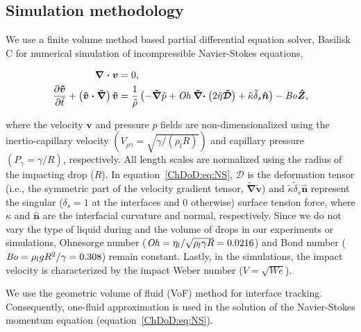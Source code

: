 \begin{subappendices}
	\section{Simulation methodology}
	\label{ChDoD:sec:simulationMethodology}
	
	We use a finite volume method based partial differential equation solver, Basilisk C \citep{basiliskpopinet1} for numerical simulation of incompressible Navier-Stokes equations,
	
	\begin{align}
		\label{ChDoD:eq:continuity}
		\boldsymbol{\nabla\cdot v} &= 0,\\
		\label{ChDoD:eq:NS}
		\frac{\partial \boldsymbol{\tilde{v}}}{\partial\tilde{t}} + \left(\boldsymbol{\tilde{v}\cdot\tilde{\nabla}}\right)\boldsymbol{\tilde{v}} &= \frac{1}{\tilde{\rho}}\left(-\boldsymbol{\tilde{\nabla}}\tilde{p} + \mathit{Oh}\boldsymbol{\tilde{\nabla}\cdot}\left(2\tilde{\eta}\boldsymbol{\tilde{\mathcal{D}}}\right) + \tilde{\kappa}\tilde{\delta}_s\boldsymbol{\hat{n}}\right) - \mathit{Bo}\boldsymbol{\hat{Z}},
	\end{align}
	
	\noindent where the velocity $\boldsymbol{v}$ and pressure $p$ fields are non-dimensionalized using the inertio-capillary velocity $\left(V_{\rho\gamma} = \sqrt{\gamma/\left(\rho_lR\right)}\right)$ and capillary pressure $\left(P_{\gamma} = \gamma/R\right)$, respectively. All length scales are normalized using the radius of the impacting drop ($R$). In equation~\eqref{ChDoD:eq:NS}, $\boldsymbol{\mathcal{D}}$ is the deformation tensor (i.e., the symmetric part of the velocity gradient tensor, $\boldsymbol{\tilde{\nabla}\tilde{v}}$) and $\tilde{\kappa}\tilde{\delta}_s\boldsymbol{\hat{n}}$ represent the singular ($\delta_s = 1$ at the interfaces and $0$ otherwise) surface tension force, where $\kappa$ and $\boldsymbol{\hat{n}}$ are the interfacial curvature and normal, respectively. Since we do not vary the type of liquid during and the volume of drops in our experiments or simulations, Ohnesorge number ($\mathit{Oh} = \eta_l/\sqrt{\rho_l\gamma R} = 0.0216$) and Bond number ($\mathit{Bo} = \rho_l g R^2/\gamma = 0.308$) remain constant. Lastly, in the simulations, the impact velocity is characterized by the impact Weber number ($V = \sqrt{We}$).
	
	We use the geometric volume of fluid (VoF) \citep{popinet2009accurate, basiliskpopinet1} method for interface tracking. Consequently, one-fluid approximation \cite{prosperetti2009computational, tryggvason2011direct} is used in the solution of the Navier-Stokes momentum equation (equation~\eqref{ChDoD:eq:NS}). 
	

\end{subappendices}
